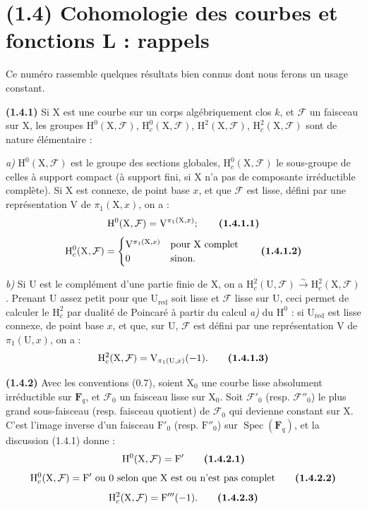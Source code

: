 \documentclass[11pt,leqno]{article}
\begin{document}
\section*{(1.4) Cohomologie des courbes et fonctions L : rappels}

Ce numéro rassemble quelques résultats bien connus dont nous ferons un usage constant.

\textbf{(1.4.1)} Si \(\mathrm{X}\) est une courbe sur un corps algébriquement clos \(k\), et \(\mathcal{F}\) un faisceau sur \(\mathrm{X}\), les groupes \(\mathrm{H}^0(\mathrm{X},\mathcal{F})\), \(\mathrm{H}_c^0(\mathrm{X},\mathcal{F})\), \(\mathrm{H}^2(\mathrm{X},\mathcal{F})\), \(\mathrm{H}_c^2(\mathrm{X},\mathcal{F})\) sont de nature élémentaire :

\textit{a)} \(\mathrm{H}^0(\mathrm{X},\mathcal{F})\) est le groupe des sections globales, \(\mathrm{H}_c^0(\mathrm{X},\mathcal{F})\) le sous-groupe de celles à support compact (à support fini, si \(\mathrm{X}\) n’a pas de composante irréductible complète). Si \(\mathrm{X}\) est connexe, de point base \(x\), et que \(\mathcal{F}\) est lisse, défini par une représentation \(\mathrm{V}\) de \(\pi_1(\mathrm{X},x)\), on a :
\[
\mathrm{H}^0(\mathrm{X},\mathcal{F})=\mathrm{V}^{\pi_1(\mathrm{X},x)};
\tag*{\textbf{(1.4.1.1)}}
\]
\[
\mathrm{H}_c^0(\mathrm{X},\mathcal{F})=
\begin{cases}
\mathrm{V}^{\pi_1(\mathrm{X},x)} & \text{pour \(\mathrm{X}\) complet}\\
0 & \text{sinon.}
\end{cases}
\tag*{\textbf{(1.4.1.2)}}
\]

\textit{b)} Si \(\mathrm{U}\) est le complément d’une partie finie de \(\mathrm{X}\), on a \(\mathrm{H}_c^2(\mathrm{U},\mathcal{F})\xrightarrow{\sim}\mathrm{H}_c^2(\mathrm{X},\mathcal{F})\). Prenant \(\mathrm{U}\) assez petit pour que \(\mathrm{U}_{\mathrm{red}}\) soit lisse et \(\mathcal{F}\) lisse sur \(\mathrm{U}\), ceci permet de calculer le \(\mathrm{H}_c^2\) par dualité de Poincaré à partir du calcul \textit{a)} du \(\mathrm{H}^0\) : si \(\mathrm{U}_{\mathrm{red}}\) est lisse connexe, de point base \(x\), et que, sur \(\mathrm{U}\), \(\mathcal{F}\) est défini par une représentation \(\mathrm{V}\) de \(\pi_1(\mathrm{U},x)\), on a :
\[
\mathrm{H}_c^2(\mathrm{X},\mathcal{F})=\mathrm{V}_{\pi_1(\mathrm{U},x)}(-1).
\tag*{\textbf{(1.4.1.3)}}
\]

\textbf{(1.4.2)} Avec les conventions (0.7), soient \(\mathrm{X}_0\) une courbe lisse absolument irréductible sur \(\mathbf{F}_q\), et \(\mathcal{F}_0\) un faisceau lisse sur \(\mathrm{X}_0\). Soit \(\mathcal{F}'_0\) (resp. \(\mathcal{F}''_0\)) le plus grand sous-faisceau (resp. faisceau quotient) de \(\mathcal{F}_0\) qui devienne constant sur \(\mathrm{X}\). C’est l’image inverse d’un faisceau \(\mathrm{F}'_0\) (resp. \(\mathrm{F}''_0\)) sur \(\operatorname{Spec}(\mathbf{F}_q)\), et la discussion (1.4.1) donne :
\[
\mathrm{H}^0(\mathrm{X},\mathcal{F})=\mathrm{F}'
\tag*{\textbf{(1.4.2.1)}}
\]
\[
\mathrm{H}_c^0(\mathrm{X},\mathcal{F})=\mathrm{F}'\text{ ou }0
\text{ selon que }\mathrm{X}\text{ est ou n’est pas complet}
\tag*{\textbf{(1.4.2.2)}}
\]
\[
\mathrm{H}_c^2(\mathrm{X},\mathcal{F})=\mathrm{F}'''(-1).
\tag*{\textbf{(1.4.2.3)}}
\]
\end{document}

